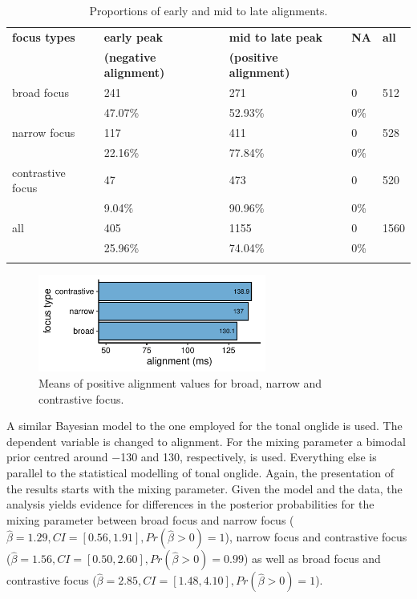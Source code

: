 \begin{table}
\caption{Proportions of early and mid to late alignments.}
\begin{tabularx}{\textwidth}{Xllll}
	\lsptoprule
\textbf{focus types	} &	\textbf{early peak}&		\textbf{mid to late peak} &		\textbf{NA} & 	\textbf{all}\\
&				\textbf{(negative alignment)} &	\textbf{(positive alignment)} &		&			\\	
\midrule
broad focus &		241 & 				271  & 					0 &			512	\\
&				47.07\% &				52.93\% &					0\% &			\\
\midrule
narrow focus &		117  &				411 & 					0  &			528 \\
&				22.16\% &				77.84\% & 					0\% &			\\
\midrule
contrastive focus &		47  &					473 &						0 &			520 \\
&				9.04\% &				90.96\% &					0\% &			\\
\midrule
all &				405 &					1155  &					0 &			1560	 \\
&				25.96\% & 				74.04\% &					0\% & 		\\ \lspbottomrule
\end{tabularx}
\label{tab:props_alignment}
\end{table}%

\begin{figure}[htbp]
\begin{center}
\includegraphics[width=7.5cm]{figures/ch6/alignment_mid_late_means.pdf}
\caption{Means of positive alignment values for broad, narrow and contrastive focus.}
\label{fig:alignment_means}
\end{center}
\end{figure}

A similar Bayesian model to the one employed for the tonal onglide is used. The dependent variable is changed to alignment. For the mixing parameter a bimodal prior centred around −130 and 130, respectively, is used. Everything else is parallel to the statistical modelling of tonal onglide. Again, the presentation of the results starts with the mixing parameter. Given the model and the data, the analysis yields evidence for differences in the posterior probabilities for the mixing parameter between broad focus and narrow focus ($\hat\beta=1.29 , CI=[0.56, 1.91], \allowbreak Pr(\hat\beta>0)=1$), narrow focus and contrastive focus ($\hat\beta=1.56, CI=[0.50, 2.60],\allowbreak Pr (\hat\beta>0)=0.99$) as well as broad focus and contrastive focus ($\hat\beta = 2.85, CI=[1.48, 4.10], \allowbreak Pr(\hat\beta>0)=1$).

